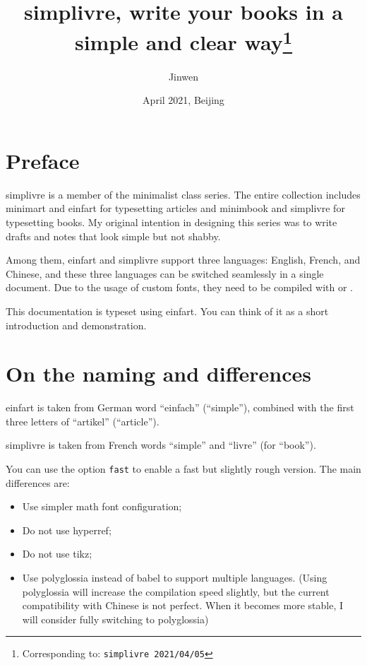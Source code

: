 \documentclass{simplivre}
\providecommand{\minimalist}{\textsf{minimalist}}
\providecommand{\minimart}{\textsf{minimart}}
\providecommand{\minimbook}{\textsf{minimbook}}
\providecommand{\einfart}{\textsf{einfart}}
\providecommand{\simplivre}{\textsf{simplivre}}
\begin{document}
\title{\simplivre{}, write your books in a simple and clear way\thanks{Corresponding to: \texttt{\simplivre{} 2021/04/05}}}
\author{Jinwen}
\date{April 2021, Beijing}

\maketitle

\frontmatter
\chapter*{Preface}

\simplivre{} is a member of the \minimalist{} class series. The entire collection includes \minimart{} and \einfart{} for typesetting articles and \minimbook{} and \simplivre{} for typesetting books. My original intention in designing this series was to write drafts and notes that look simple but not shabby.

Among them, \einfart{} and \simplivre{} support three languages: English, French, and Chinese, and these three languages can be switched seamlessly in a single document. Due to the usage of custom fonts, they need to be compiled with  or .

This documentation is typeset using \einfart{}. You can think of it as a short introduction and demonstration.


\tableofcontents

\mainmatter

\chapter{On the naming and differences}
\einfart{} is taken from German word ``einfach'' (``simple''), combined with the first three letters of ``artikel'' (``article'').

\simplivre{} is taken from French words ``simple'' and ``livre'' (for ``book'').

You can use the option \verb|fast| to enable a fast but slightly rough version. The main differences are:
\begin{itemize}
    \item Use simpler math font configuration; 
    \item Do not use hyperref; 
    \item Do not use tikz; 
    \item Use polyglossia instead of babel to support multiple languages. (Using polyglossia will increase the compilation speed slightly, but the current compatibility with Chinese is not perfect. When it becomes more stable, I will consider fully switching to polyglossia)
\end{itemize}
\end{document}

